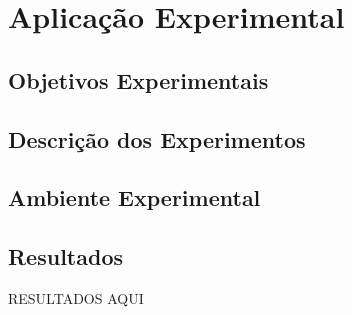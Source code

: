 \chapter{Aplicação Experimental} \label{cap5}
\section{Objetivos Experimentais}
\section{Descrição dos Experimentos}
\section{Ambiente Experimental}
\section{Resultados}
RESULTADOS AQUI

